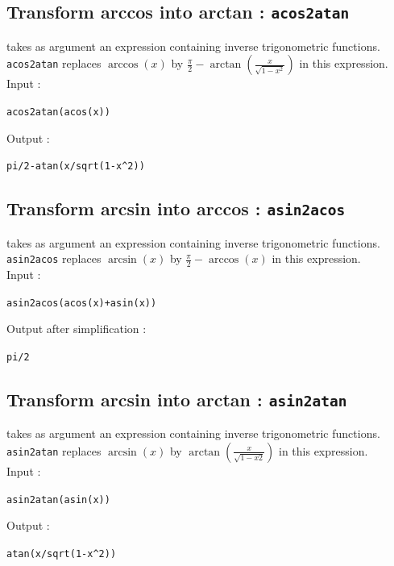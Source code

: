 \documentclass[a4paper,11pt]{book}
\begin{document}
\subsection{Transform arccos into arctan : {\tt acos2atan}}
 takes as argument an expression containing 
inverse trigonometric functions.\\
{\tt acos2atan}  replaces $\arccos(x)$ by
$\displaystyle \frac{\pi}{2}-\arctan(\frac{x}{\sqrt{1-x^2}})$ in this 
expression.\\
Input :
\begin{center}{\tt acos2atan(acos(x))}\end{center}
Output :
\begin{center}{\tt  pi/2-atan(x/sqrt(1-x\verb|^|2))}\end{center}

\subsection{Transform arcsin into arccos : {\tt asin2acos}}
 takes as argument an 
expression containing inverse trigonometric functions.\\
{\tt asin2acos} replaces $\arcsin(x)$  by
$\displaystyle \frac{\pi}{2}-\arccos(x)$ in this expression.\\
Input :
\begin{center}{\tt asin2acos(acos(x)+asin(x))}\end{center}
Output after simplification :
\begin{center}{\tt pi/2}\end{center}

\subsection{Transform arcsin into arctan : {\tt asin2atan}}
 takes as argument an expression containing 
inverse trigonometric functions.\\
{\tt asin2atan} replaces $\arcsin(x)$  by 
$\displaystyle \arctan(\frac{x}{\sqrt{1-x2}})$ in this expression.\\
Input :
\begin{center}{\tt asin2atan(asin(x))}\end{center}
Output :
\begin{center}{\tt atan(x/sqrt(1-x\verb|^|2))}\end{center}
\end{document}
